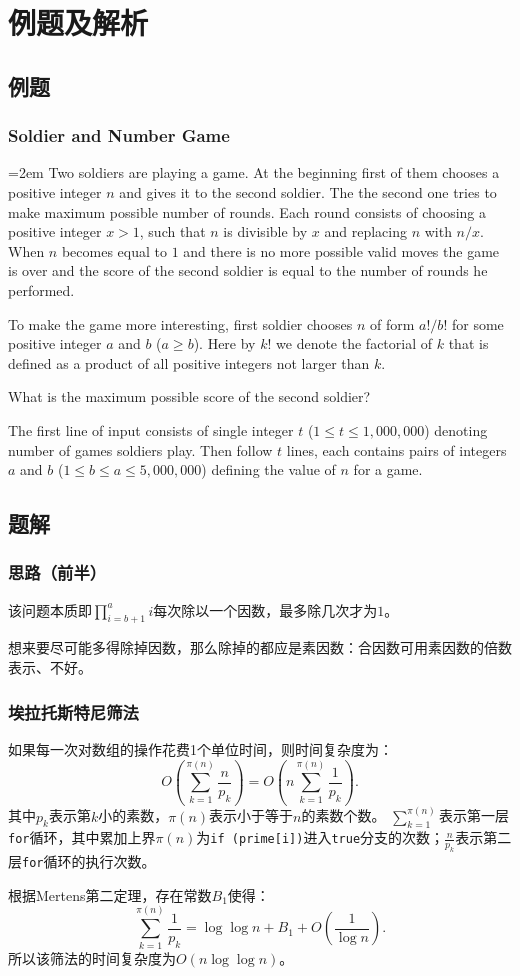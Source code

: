 \documentclass{beamer}
\begin{document}
\section{例题及解析}

\subsection{例题}

\begin{frame}
  \frametitle{Soldier and Number Game}
  \small\parindent=2em
  Two soldiers are playing a game.
  At the beginning first of them chooses a positive integer $n$ and gives it to the second soldier.
  The the second one tries to make maximum possible number of rounds.
  Each round consists of choosing a positive integer $x>1$, such that $n$ is divisible by $x$ and replacing $n$ with $n/x$.
  When $n$ becomes equal to $1$ and there is no more possible valid moves the game is over and the score of the second soldier is equal to the number of rounds he performed.

  To make the game more interesting, first soldier chooses $n$ of form $a!/b!$ for some positive integer $a$ and $b$ ($a \geq b$).
  Here by $k!$ we denote the factorial of $k$ that is defined as a product of all positive integers not larger than $k$.

  What is the maximum possible score of the second soldier?

  The first line of input consists of single integer $t$ ($1 \leq t \leq 1,000,000$) denoting number of games soldiers play.
  Then follow $t$ lines, each contains pairs of integers $a$ and $b$ ($1 \leq b \leq a \leq 5,000,000$) defining the value of $n$ for a game.
\end{frame}

\subsection{题解}

\begin{frame}
  \frametitle{思路（前半）}
  该问题本质即$\prod^a_{i = b + 1} i$每次除以一个因数，最多除几次才为$1$。

  想来要尽可能多得除掉因数，那么除掉的都应是素因数：合因数可用素因数的倍数表示、不好。
\end{frame}

\begin{frame}[fragile]
  \frametitle{埃拉托斯特尼筛法}
  如果每一次对数组的操作花费1个单位时间，则时间复杂度为：
  $$
    O \left( \sum^{\pi(n)}_{k=1} \frac{n}{p_k} \right) =
    O \left( n \sum^{\pi(n)}_{k=1} \frac{1}{p_k} \right).
  $$
  其中$p_k$表示第$k$小的素数，$\pi(n)$表示小于等于$n$的素数个数。
  $\sum^{\pi(n)}_{k=1}$表示第一层\verb|for|循环，其中累加上界$\pi(n)$为\verb|if (prime[i])|进入\verb|true|分支的次数；$\frac{n}{p_k}$表示第二层\verb|for|循环的执行次数。

  根据Mertens第二定理，存在常数$B_1$使得：
  $$
    \sum^{\pi(n)}_{k=1} \frac{1}{p_k} = \log \log n + B_1 + O \left( \frac{1}{\log n} \right).
  $$
  所以该筛法的时间复杂度为$O(n \log \log n)$。
\end{frame}
\end{document}
